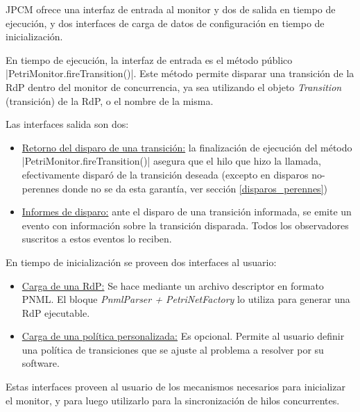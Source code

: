 JPCM ofrece una interfaz de entrada al monitor y dos de salida en tiempo de
ejecución, y dos interfaces de carga de datos de configuración en tiempo de
inicialización.

En tiempo de ejecución, la interfaz de entrada es el método público 
|PetriMonitor.fireTransition()|. Este método permite disparar una
transición de la RdP dentro del monitor de concurrencia, ya sea utilizando el
objeto \textit{Transition} (transición) de la RdP, o el nombre de la misma.

Las interfaces salida son dos:
\begin{itemize}
  \item \underline{Retorno del disparo de una transición:} la finalización de
  ejecución del método |PetriMonitor.fireTransition()| asegura que el
  hilo que hizo la llamada, efectivamente disparó de la transición deseada
  (excepto en disparos no-perennes donde no se da esta garantía, ver sección
  \ref{disparos_perennes})
  \item \underline{Informes de disparo:} ante el disparo de una
  transición informada, se emite un evento con información sobre la transición
  disparada. Todos los observadores suscritos a estos eventos lo reciben.
\end{itemize}

En tiempo de inicialización se proveen dos interfaces al usuario:
\begin{itemize} 
  \item \underline{Carga de una RdP:} Se hace mediante un archivo descriptor
  en formato PNML. El bloque \textit{PnmlParser + PetriNetFactory} lo utiliza
  para generar una RdP ejecutable.
  \item \underline{Carga de una política personalizada:} Es opcional. Permite
  al usuario definir una política de transiciones que se ajuste al problema a
  resolver por su software.
\end{itemize}

Estas interfaces proveen al usuario de los mecanismos necesarios para
inicializar el monitor, y para luego utilizarlo para la sincronización de hilos
concurrentes.

